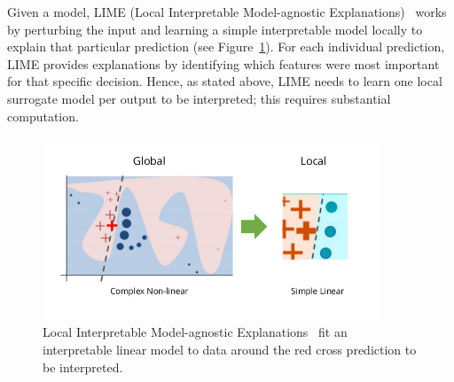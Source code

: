 Given a model, LIME (Local Interpretable Model-agnostic Explanations)~\cite{lime} works by perturbing the input and learning a simple interpretable model locally to explain that particular prediction (see Figure~\ref{fig:lime}). For each individual prediction, LIME provides explanations by identifying which features were most important for that specific decision.
Hence, as stated above, LIME needs to learn one local surrogate model per output to be interpreted; this requires substantial computation.

\begin{figure}
    \includegraphics[width=0.9\textwidth]{images/lime.png}
    \caption{Local Interpretable Model-agnostic Explanations~\cite{lime} fit an interpretable linear model to data around the red cross prediction to be interpreted.}\label{fig:lime}
\end{figure}


